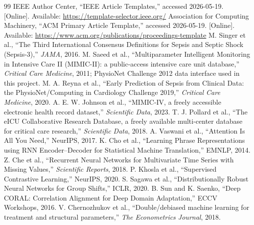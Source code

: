 \documentclass[11pt,a4paper]{article}
\begin{document}
\begingroup
\raggedright
\begin{thebibliography}{99}
IEEE Author Center, ``IEEE Article Templates,'' accessed 2026-05-19. [Online]. Available: \url{https://template-selector.ieee.org/}
Association for Computing Machinery, ``ACM Primary Article Template,'' accessed 2026-05-19. [Online]. Available: \url{https://www.acm.org/publications/proceedings-template}
M. Singer et al., ``The Third International Consensus Definitions for Sepsis and Septic Shock (Sepsis-3),'' \emph{JAMA}, 2016.
M. Saeed et al., ``Multiparameter Intelligent Monitoring in Intensive Care II (MIMIC-II): a public-access intensive care unit database,'' \emph{Critical Care Medicine}, 2011; PhysioNet Challenge 2012 data interface used in this project.
M. A. Reyna et al., ``Early Prediction of Sepsis from Clinical Data: the PhysioNet/Computing in Cardiology Challenge 2019,'' \emph{Critical Care Medicine}, 2020.
A. E. W. Johnson et al., ``MIMIC-IV, a freely accessible electronic health record dataset,'' \emph{Scientific Data}, 2023.
T. J. Pollard et al., ``The eICU Collaborative Research Database, a freely available multi-center database for critical care research,'' \emph{Scientific Data}, 2018.
A. Vaswani et al., ``Attention Is All You Need,'' NeurIPS, 2017.
K. Cho et al., ``Learning Phrase Representations using RNN Encoder--Decoder for Statistical Machine Translation,'' EMNLP, 2014.
Z. Che et al., ``Recurrent Neural Networks for Multivariate Time Series with Missing Values,'' \emph{Scientific Reports}, 2018.
P. Khosla et al., ``Supervised Contrastive Learning,'' NeurIPS, 2020.
S. Sagawa et al., ``Distributionally Robust Neural Networks for Group Shifts,'' ICLR, 2020.
B. Sun and K. Saenko, ``Deep CORAL: Correlation Alignment for Deep Domain Adaptation,'' ECCV Workshops, 2016.
V. Chernozhukov et al., ``Double/debiased machine learning for treatment and structural parameters,'' \emph{The Econometrics Journal}, 2018.
\end{thebibliography}
\endgroup
\end{document}
